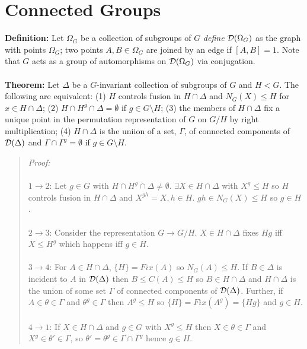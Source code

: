 \section{Connected Groups}
{\bf Definition:}  
Let $\Omega_G$ be a collection of subgroups of $G$ \emph{define}
${\cal D}(\Omega_G)$ as the graph with points $\Omega_G$; two points
$A,B \in \Omega_G$ are joined by an edge if $[A,B]=1$.  Note that $G$ acts as a
group of automorphisms on ${\cal D}(\Omega_G)$ via conjugation.
\\
\\
{\bf Theorem:} 
Let $\Delta$ be a $G$-invariant collection of subgroups of $G$ and $H < G$.
The following are equivalent:
(1) $H$ controls fusion in $H \cap \Delta$ and $N_G(X) \le H$ for $x \in H \cap \Delta$;
(2) $H \cap H^g \cap \Delta= \emptyset$ if $g \in G \setminus H$;
(3) the members of $H \cap \Delta$ fix a unique point in the permutation representation
of $G$ on $G/H$ by right multiplication;
(4) $H \cap \Delta$ is the uniion of a set, $\Gamma$, of connected components of
${\cal D}(\Delta)$ and $\Gamma \cap \Gamma^g= \emptyset$ if $g \in G \setminus H$.
\begin{quote}
\emph{Proof:}  
\\
\\
$1 \rightarrow 2$:
Let $g \in G$ with $H \cap H^g \cap \Delta \ne \emptyset$.  $\exists X \in H \cap \Delta$
with $X^g \le H$ so $H$ controls fusion in $H \cap \Delta$ and
$X^{gh}=X, h \in H$.  $gh \in N_G(X) \le H$ so $g \in H$.
\\
\\
$2 \rightarrow 3$:
Consider the representation $G \rightarrow G/H$.  $X \in H \cap \Delta$ fixes
$Hg$ iff $X \le H^g$ which happens iff $g \in H$.
\\
\\
$3 \rightarrow 4$:
For $A \in H \cap \Delta$, $\{ H \} = Fix(A)$ so $N_G(A) \le H$.  If $B \in \Delta$ is incident
to $A$ in ${\cal D}(\Delta)$ then $B \le C(A) \le H$ so $B \in H \cap \Delta$ and
$H \cap \Delta$ is the union of some set $\Gamma$ of connected components of ${\cal D}( \Delta )$.
Further, if $A \in \theta \in \Gamma$ and $\theta^g \in \Gamma$ then
$A^g \le H$ so $\{ H \} = Fix(A^g ) = \{ Hg \}$ and $g \in H$.
\\
\\
$4 \rightarrow 1$:
If $X \in H \cap \Delta$ and $g \in G$ with $X^g \le H$ then 
$X \in \theta \in \Gamma$ and
$X^g \in \theta' \in \Gamma$, so $\theta' = \theta^g \in \Gamma \cap \Gamma^g$ hence
$g \in H$.
\end{quote}
